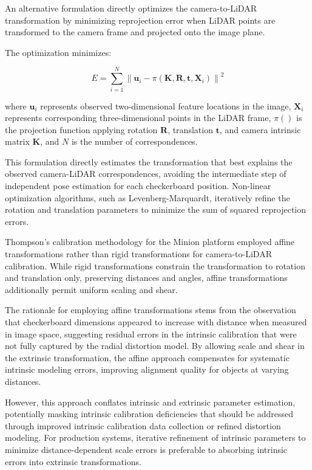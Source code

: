 \documentclass{erauthesis}
\begin{document}

An alternative formulation directly optimizes the camera-to-LiDAR transformation by minimizing reprojection error when LiDAR points are transformed to the camera frame and projected onto the image plane.

The optimization minimizes:

\begin{equation}
    E = \sum_{i=1}^{N} \left\| \mathbf{u}_i - \pi(\mathbf{K}, \mathbf{R}, \mathbf{t}, \mathbf{X}_i) \right\|^2
\end{equation}


where $\mathbf{u}_i$ represents observed two-dimensional feature locations in the image, $\mathbf{X}_i$ represents corresponding three-dimensional points in the LiDAR frame, $\pi()$ is the projection function applying rotation $\mathbf{R}$, translation $\mathbf{t}$, and camera intrinsic matrix $\mathbf{K}$, and $N$ is the number of correspondences.

This formulation directly estimates the transformation that best explains the observed camera-LiDAR correspondences, avoiding the intermediate step of independent pose estimation for each checkerboard position.
Non-linear optimization algorithms, such as Levenberg-Marquardt, iteratively refine the rotation and translation parameters to minimize the sum of squared reprojection errors.


Thompson's calibration methodology for the Minion platform employed affine transformations rather than rigid transformations for camera-to-LiDAR calibration.
While rigid transformations constrain the transformation to rotation and translation only, preserving distances and angles, affine transformations additionally permit uniform scaling and shear.

The rationale for employing affine transformations stems from the observation that checkerboard dimensions appeared to increase with distance when measured in image space, suggesting residual errors in the intrinsic calibration that were not fully captured by the radial distortion model.
By allowing scale and shear in the extrinsic transformation, the affine approach compensates for systematic intrinsic modeling errors, improving alignment quality for objects at varying distances.

However, this approach conflates intrinsic and extrinsic parameter estimation, potentially masking intrinsic calibration deficiencies that should be addressed through improved intrinsic calibration data collection or refined distortion modeling.
For production systems, iterative refinement of intrinsic parameters to minimize distance-dependent scale errors is preferable to absorbing intrinsic errors into extrinsic transformations.
\end{document}

